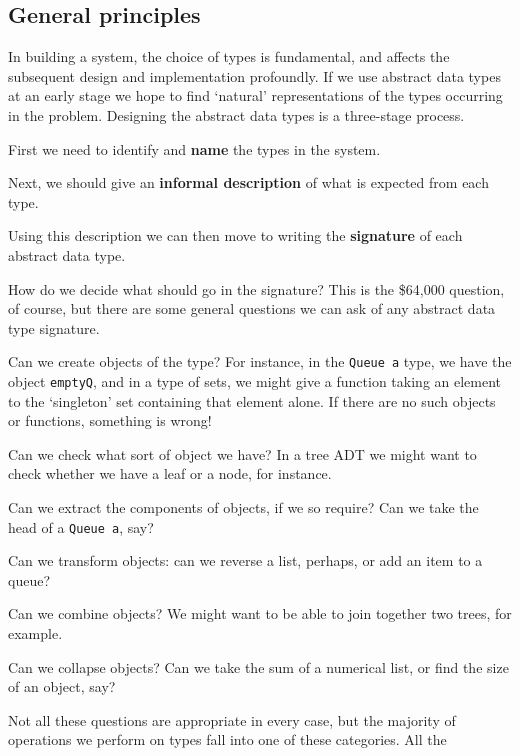 \subsection*{General principles}

In building a system, the choice of types is fundamental, and affects the
subsequent design and implementation profoundly. If we use abstract data
types at an early stage we hope to find `natural' representations of the
types occurring in the problem. Designing the abstract data types is a three-stage process.  
\begin{titemize}
\item First we need
to identify and \textbf{name} the types in the system.
\item Next, we should give
an \textbf{informal description} of what is expected from each type. 
\item Using this
description we can then move to writing the \textbf{signature} of each 
abstract data type.
\end{titemize}
How do we decide what should go in the signature? This is the \$64,000
question, of course, but there are some general questions we can ask of any
abstract data type signature.
\begin{titemize}
\item Can we create objects of the type? For instance, in the \texttt{Queue a}
type, we have the object \texttt{emptyQ}, and in a type of sets, we might give a
function taking an element to the `singleton' set containing that element
alone. If there are no such objects or functions, something is wrong!
\item Can we check what sort of object we have? In a tree ADT we might
want to check whether we have a leaf or a node, for instance.
\item Can we extract the components of objects, if we so require? Can we take
the head of a \texttt{Queue a}, say?
\item Can we transform objects: can we reverse a list, perhaps, or add an
item to a queue? 
\item Can we combine objects? We might want to be able to join
together two trees, for example.
\item Can we collapse objects? Can we take the sum of a numerical list, or
find the size of an object, say? 
\end{titemize}
Not all these questions are appropriate in every case, but the majority of
operations we perform on types fall into one of these categories. All the
